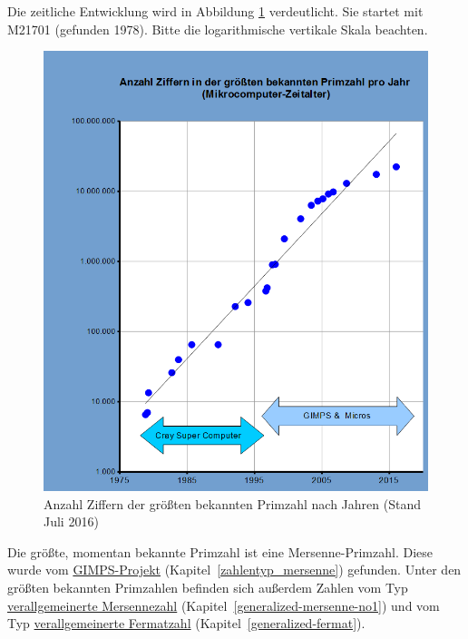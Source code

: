 \begin{refsegment}
Die zeitliche Entwicklung wird in Abbildung \ref{Figure_Caldwell_Largest-Known-Prime-From1975}
verdeutlicht. Sie startet mit M21701 (gefunden 1978). Bitte die logarithmische vertikale Skala beachten.
\begin{figure}[ht]
\begin{center}
\includegraphics[scale=0.7]{figures/Caldwell_From1975-2016-de.png}
\caption[Anzahl Ziffern der größten bekannten Primzahl nach Jahren seit 1975]
        {Anzahl Ziffern der größten bekannten Primzahl nach Jahren (Stand Juli 2016)\footnotemark}
\label{Figure_Caldwell_Largest-Known-Prime-From1975}
\end{center}
\end{figure}

Die größte, momentan bekannte Primzahl ist eine Mersenne-Primzahl.
Diese wurde vom \hyperlink{GIMPS-project}{GIMPS-Projekt}
(Kapitel~\ref{zahlentyp_mersenne}) gefunden.
Unter den größten bekannten Primzahlen befinden sich außerdem Zahlen
vom Typ \hyperlink{generalizedMersennenumbers}{verallgemeinerte Mersennezahl}
(Kapitel~\ref{generalized-mersenne-no1})
und
vom Typ \hyperlink{generalizedFermatprimes}{verallgemeinerte Fermatzahl}
(Kapitel~\ref{generalized-fermat}).


\end{refsegment}

